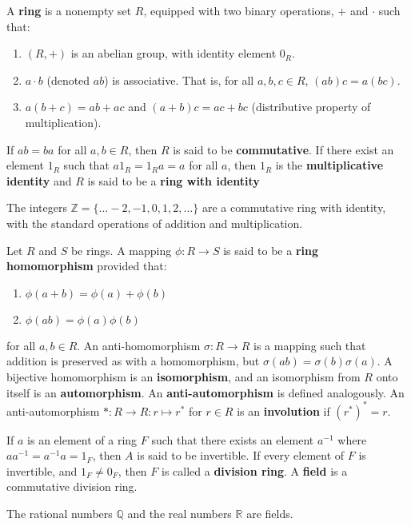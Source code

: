 \documentclass[11pt]{article}
\begin{document}
\begin{definition*}
A \textbf{ring} is a nonempty set $R$, equipped with two binary operations, $+$ and $\cdot$ such that:
\begin{enumerate}
\item $(R, +)$ is an abelian group, with identity element $0_R$.
\item $a \cdot b$ (denoted $ab$) is associative. That is, for all $a, b, c \in R$, $(ab)c = a(bc)$.
\item $a(b + c) = ab + ac$ and $(a + b)c = ac + bc$ (distributive property of multiplication).
\end{enumerate}
If $ab = ba$ for all $a, b \in R$, then $R$ is said to be \textbf{commutative}.
If there exist an element $1_R$ such that $a 1_R = 1_R a = a$ for all $a$, then $1_R$ is the \textbf{multiplicative identity}
and $R$ is said to be a \textbf{ring with identity}
\end{definition*}
\begin{example*}
The integers $\mathbb{Z} = \{\dotsc -2, -1, 0, 1, 2, \dotsc \}$ are a commutative ring with identity, with the standard operations of addition and multiplication.
\end{example*}

\begin{definition*}
Let $R$ and $S$ be rings.
A mapping $\phi: R \to S$ is said to be a \textbf{ring homomorphism} provided that:
\begin{enumerate}
\item $\phi(a + b) = \phi(a) + \phi(b)$
\item $\phi(ab) = \phi(a) \phi(b)$
\end{enumerate}
for all $a, b \in R$.
An anti-homomorphism $\sigma: R \to R$ is a mapping such that addition is preserved as with a homomorphism, but $\sigma(ab) = \sigma(b) \sigma(a)$.
A bijective homomorphism is an \textbf{isomorphism}, and an isomorphism from $R$ onto itself is an \textbf{automorphism}.
An \textbf{anti-automorphism} is defined analogously.
An anti-automorphism $*: R \to R: r \mapsto r^*$ for $r \in R$ is an \textbf{involution} if $(r^*)^* = r$.
\end{definition*}

\begin{definition*}
If $a$ is an element of a ring $F$ such that there exists an element $a^{-1}$ where $a a^{-1} = a^{-1}a = 1_F$, then $A$ is said to be invertible.
If every element of $F$ is invertible, and $1_F \ne 0_F$, then $F$ is called a \textbf{division ring}.
A \textbf{field} is a commutative division ring.
\end{definition*}
\begin{example*}
The rational numbers $\mathbb{Q}$ and the real numbers $\mathbb{R}$ are fields.
\end{example*}
\end{document}
